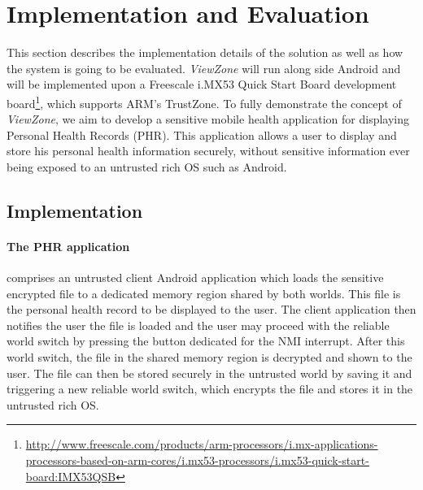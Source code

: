 
% 
% 
\section{Implementation and Evaluation}
\label{sec:evaluation}

This section describes the implementation details of the solution as well as how the system is going to be evaluated. \emph{ViewZone} will run along side Android and will be implemented upon a Freescale i.MX53 Quick Start Board development board\footnote{\url{http://www.freescale.com/products/arm-processors/i.mx-applications-processors-based-on-arm-cores/i.mx53-processors/i.mx53-quick-start-board:IMX53QSB}}, which supports ARM's TrustZone. To fully demonstrate the concept of \emph{ViewZone}, we aim to develop a sensitive mobile health application for displaying Personal Health Records (PHR). This application allows a user to display and store his personal health information securely, without sensitive information ever being exposed to an untrusted rich OS such as Android.

\subsection{Implementation}

\paragraph{The \ac{PHR} application} comprises an untrusted client Android application which loads the sensitive encrypted file to a dedicated memory region shared by both worlds. This file is the personal health record to be displayed to the user. The client application then notifies the user the file is loaded and the user may proceed with the reliable world switch by pressing the button dedicated for the \ac{NMI} interrupt. After this world switch, the file in the shared memory region is decrypted and shown to the user. The file can then be stored securely in the untrusted world by saving it and triggering a new reliable world switch, which encrypts the file and stores it in the untrusted rich OS.

